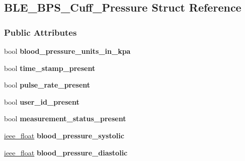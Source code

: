 \hypertarget{struct_b_l_e___b_p_s___cuff___pressure}{}\subsection{B\+L\+E\+\_\+\+B\+P\+S\+\_\+\+Cuff\+\_\+\+Pressure Struct Reference}
\label{struct_b_l_e___b_p_s___cuff___pressure}
\subsubsection*{Public Attributes}
\begin{DoxyCompactItemize}
\item 
bool {\bfseries blood\+\_\+pressure\+\_\+units\+\_\+in\+\_\+kpa}\hypertarget{struct_b_l_e___b_p_s___cuff___pressure_a4afef6fba0f0519d21f75b8db8b2122f}{}\label{struct_b_l_e___b_p_s___cuff___pressure_a4afef6fba0f0519d21f75b8db8b2122f}

\item 
bool {\bfseries time\+\_\+stamp\+\_\+present}\hypertarget{struct_b_l_e___b_p_s___cuff___pressure_adf0d4aab24f3fbe06188155e0be1d0f5}{}\label{struct_b_l_e___b_p_s___cuff___pressure_adf0d4aab24f3fbe06188155e0be1d0f5}

\item 
bool {\bfseries pulse\+\_\+rate\+\_\+present}\hypertarget{struct_b_l_e___b_p_s___cuff___pressure_ab0a3e9aed9da257dcc4003b7fc3df84b}{}\label{struct_b_l_e___b_p_s___cuff___pressure_ab0a3e9aed9da257dcc4003b7fc3df84b}

\item 
bool {\bfseries user\+\_\+id\+\_\+present}\hypertarget{struct_b_l_e___b_p_s___cuff___pressure_a25ab2cc4bf64706cc9b9deac37649f46}{}\label{struct_b_l_e___b_p_s___cuff___pressure_a25ab2cc4bf64706cc9b9deac37649f46}

\item 
bool {\bfseries measurement\+\_\+status\+\_\+present}\hypertarget{struct_b_l_e___b_p_s___cuff___pressure_a92e5dce1dca103a65dee54c4d0931eeb}{}\label{struct_b_l_e___b_p_s___cuff___pressure_a92e5dce1dca103a65dee54c4d0931eeb}

\item 
\hyperlink{structieee__float}{ieee\+\_\+float} {\bfseries blood\+\_\+pressure\+\_\+systolic}\hypertarget{struct_b_l_e___b_p_s___cuff___pressure_acb155550a6841cd64d728fa174084453}{}\label{struct_b_l_e___b_p_s___cuff___pressure_acb155550a6841cd64d728fa174084453}

\item 
\hyperlink{structieee__float}{ieee\+\_\+float} {\bfseries blood\+\_\+pressure\+\_\+diastolic}\hypertarget{struct_b_l_e___b_p_s___cuff___pressure_a9aaa9c84e1e6914b857360262362b78f}{}\label{struct_b_l_e___b_p_s___cuff___pressure_a9aaa9c84e1e6914b857360262362b78f}


\end{DoxyCompactItemize}
